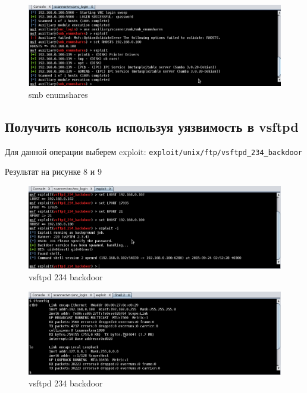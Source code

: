 \documentclass[11pt, a4paper]{article}		%
\begin{document}
\begin{figure}[h!]
\centering
\includegraphics[scale=0.8]{res/meta5}
\caption{smb enumshares}
\end{figure}




\subsection{Получить консоль используя уязвимость в vsftpd}

Для данной операции выберем exploit: \verb'exploit/unix/ftp/vsftpd_234_backdoor'

Результат на рисунке 8 и 9

\begin{figure}[h!]
\centering
\includegraphics[scale=0.8]{res/meta6}
\caption{vsftpd 234 backdoor}
\end{figure}

\begin{figure}[h!]
\centering
\includegraphics[scale=0.8]{res/meta7}
\caption{vsftpd 234 backdoor}
\end{figure}
\end{document}
